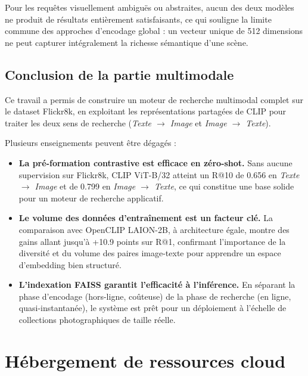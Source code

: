 \documentclass[a4paper,11pt]{article}
\begin{document}
Pour les requêtes visuellement ambiguës ou abstraites,
aucun des deux modèles ne produit de résultats entièrement
satisfaisants, ce qui souligne la limite commune des approches
d'encodage global : un vecteur unique de 512 dimensions
ne peut capturer intégralement la richesse sémantique d'une scène.
 
\subsection{Conclusion de la partie multimodale}
 
Ce travail a permis de construire un moteur de recherche multimodal
complet sur le dataset Flickr8k, en exploitant les représentations
partagées de CLIP pour traiter les deux sens de recherche
(\textit{Texte $\rightarrow$ Image} et \textit{Image $\rightarrow$ Texte}).
 
Plusieurs enseignements peuvent être dégagés :
 
\begin{itemize}
    \item \textbf{La pré-formation contrastive est efficace en
          zéro-shot.} Sans aucune supervision sur Flickr8k, CLIP
          ViT-B/32 atteint un R@10 de 0.656 en \textit{Texte $\rightarrow$ Image}
          et de 0.799 en \textit{Image $\rightarrow$ Texte}, ce qui
          constitue une base solide pour un moteur de recherche
          applicatif.
 
    \item \textbf{Le volume des données d'entraînement est un facteur clé.}
          La comparaison avec OpenCLIP LAION-2B, à architecture égale,
          montre des gains allant jusqu'à +10.9 points sur R@1, confirmant
          l'importance de la diversité et du volume des paires
          image-texte pour apprendre un espace d'embedding bien structuré.
 
    \item \textbf{L'indexation FAISS garantit l'efficacité à l'inférence.}
          En séparant la phase d'encodage (hors-ligne, coûteuse) de
          la phase de recherche (en ligne, quasi-instantanée),
          le système est prêt pour un déploiement à l'échelle
          de collections photographiques de taille réelle.
\end{itemize}
 




\newpage
\section{Hébergement de ressources cloud}
\label{sec:part3}
\end{document}
